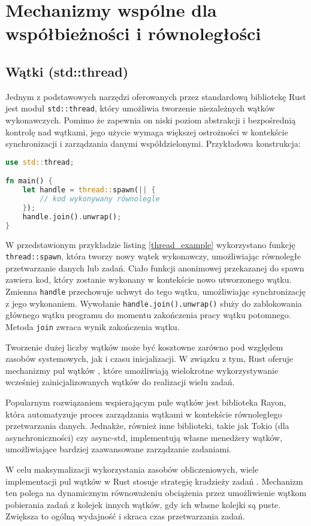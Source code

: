 \section{Mechanizmy wspólne dla współbieżności i równoległości}
\subsection{Wątki (std::thread)}
Jednym z podstawowych narzędzi oferowanych przez standardową bibliotekę Rust jest moduł \texttt{std::thread}, który umożliwia tworzenie niezależnych wątków wykonawczych. Pomimo że zapewnia on niski poziom abstrakcji i bezpośrednią kontrolę nad wątkami, jego użycie wymaga większej ostrożności w kontekście synchronizacji i zarządzania danymi współdzielonymi.
Przykładowa konstrukcja:
\begin{lstlisting}[language=Rust, caption=Przykład tworzenia wątku, label=thread_example]
use std::thread;

fn main() {
    let handle = thread::spawn(|| {
        // kod wykonywany równolegle
    });
    handle.join().unwrap();
}
\end{lstlisting}
W przedstawionym przykładzie listing \ref{thread_example} wykorzystano funkcję \texttt{thread::spawn}, która tworzy nowy wątek wykonawczy, umożliwiając równoległe przetwarzanie danych lub zadań. Ciało funkcji anonimowej przekazanej do spawn zawiera kod, który zostanie wykonany w kontekście nowo utworzonego wątku. Zmienna \texttt{handle} przechowuje uchwyt do tego wątku, umożliwiając synchronizację z jego wykonaniem.
Wywołanie \texttt{handle.join().unwrap()} służy do zablokowania głównego wątku programu do momentu zakończenia pracy wątku potomnego. Metoda \texttt{join} zwraca wynik zakończenia wątku.

Tworzenie dużej liczby wątków może być kosztowne zarówno pod względem zasobów systemowych, jak i czasu inicjalizacji. W związku z tym, Rust oferuje mechanizmy pul wątków , które umożliwiają wielokrotne wykorzystywanie wcześniej zainicjalizowanych wątków do realizacji wielu zadań.

Popularnym rozwiązaniem wspierającym pule wątków jest biblioteka Rayon, która automatyzuje proces zarządzania wątkami w kontekście równoległego przetwarzania danych. Jednakże, również inne biblioteki, takie jak Tokio (dla asynchroniczności) czy async-std, implementują własne menedżery wątków, umożliwiające bardziej zaawansowane zarządzanie zadaniami.

W celu maksymalizacji wykorzystania zasobów obliczeniowych, wiele implementacji pul wątków w Rust stosuje strategię kradzieży zadań . Mechanizm ten polega na dynamicznym równoważeniu obciążenia przez umożliwienie wątkom pobierania zadań z kolejek innych wątków, gdy ich własne kolejki są puste. Zwiększa to ogólną wydajność i skraca czas przetwarzania zadań.

